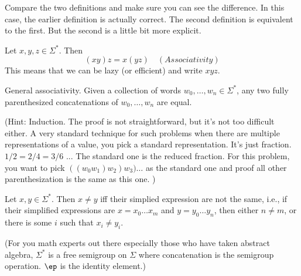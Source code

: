 Compare the two definitions and make sure you can see the difference.
In this case, the earlier definition is actually correct.
The second definition is equivalent to the first.
But the second is a little bit more explicit.

\begin{prop}
Let $x,y,z\in \Sigma^*$. Then
\[ (xy) z = x(yz) \quad (Associativity) \]
This means that we can be lazy (or efficient) and write $xyz$.
\end{prop}

\begin{prop}
General associativity.
Given a collection of words $w_0, \ldots, w_n \in \Sigma^*$,
any two fully parenthesized concatenations of
$w_0, \ldots, w_n$
are equal.
\end{prop}

(Hint: Induction.
The proof is not straightforward, but it's not too difficult either.
A very standard technique for such problems when there are multiple
representations of a value, you pick a standard representation.
It's just fraction. $1/2 = 2/4 = 3/6$ ... The standard one is the reduced
fraction.
For this problem, you want to pick $((w_0 w_1) w_2 ) w_3) \ldots$
as the standard one and proof all other parenthesization is the same as this
one.
)





\begin{defn}
Let $x,y \in \Sigma^*$. Then $x \neq y$ iff their simplied
expression are not the same, i.e., if their simplified expressions
are $x = x_0\ldots x_m$ and $y=y_0 \ldots y_n$, then either $n
\neq m$, or there is some $i$ such that $x_i \neq y_i$.
\end{defn}


(For you math experts out there especially those
who have taken abstract algebra, $\Sigma^*$ is a free semigroup on
$\Sigma$ where concatenation is the semigroup operation.
$\ep$ is the identity element.)
